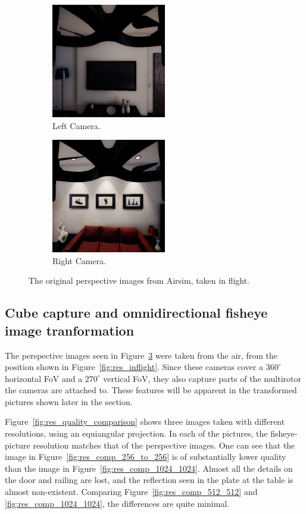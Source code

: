 \begin{figure}[!htb]
\begin{subfigure}{0.32\textwidth}
        \centering
        \includegraphics[height=5cm]{rapport/fig/Results/single/left_center.jpeg}
        \caption{Left Camera.}
        \label{fig:res_original_left}
    \end{subfigure}
    \begin{subfigure}{0.32\textwidth}
        \centering
        \includegraphics[height=5cm]{rapport/fig/Results/single/right_center.jpeg}
        \caption{Right Camera.}
        \label{fig:res_original_right}
    \end{subfigure}
    \centering
    \caption{The original perspective images from Airsim, taken in flight.}
    \label{fig:res_original_pictures}
\end{figure}

\subsection{Cube capture and omnidirectional fisheye image tranformation}

The perspective images seen in Figure~\ref{fig:res_original_pictures} were taken from the air, from the position shown in Figure~\ref{fig:res_inflight}. Since these cameras cover a $360^\circ$ horizontal FoV and a $270^\circ$ vertical FoV, they also capture parts of the multirotor the cameras are attached to. These features will be apparent in the transformed pictures shown later in the section.

Figure~\ref{fig:res_quality_comparison} shows three images taken with different resolutions, using an equiangular projection. In each of the pictures, the fisheye-picture resolution matches that of the perspective images. One can see that the image in Figure~\ref{fig:res_comp_256_to_256} is of substantially lower quality than the image in Figure~\ref{fig:res_comp_1024_1024}. Almost all the details on the door and railing are lost, and the reflection seen in the plate at the table is almost non-existent. Comparing Figure~\ref{fig:res_comp_512_512} and \ref{fig:res_comp_1024_1024}, the differences are quite minimal.

